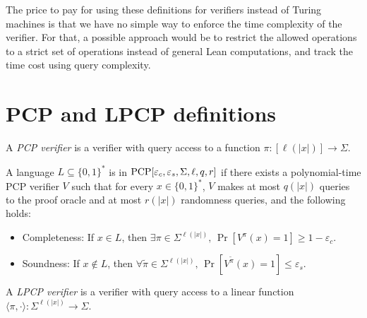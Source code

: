 \begin{remark}
The price to pay for using these definitions for verifiers instead of Turing machines is that we have no simple way to enforce
the time complexity of the verifier. For that, a possible approach would be to restrict the allowed operations to a strict set
of operations instead of general Lean computations, and track the time cost using query complexity.
\end{remark}
\section{PCP and LPCP definitions}

\begin{definition}
\label{PCPVerifier}
\leanok
A \emph{PCP verifier} is a verifier with query access to a function $\pi : [\ell (|x|)] \to \Sigma$.
\end{definition}

\begin{definition}
\label{PCP}
\leanok
A language $L \subseteq \{0,1\}^*$ is in
$\mathrm{PCP}[\varepsilon_c, \varepsilon_s, \Sigma, \ell, q, r]$
if there exists a polynomial-time PCP verifier $V$
such that for every $x \in \{0,1\}^*$,
$V$ makes at most $q(|x|)$ queries to the proof oracle and
at most $r(|x|)$ randomness queries, and the following holds:
\begin{itemize}
  \item Completeness: If $x \in L$, then
  $\exists \pi \in \Sigma^{\ell(|x|)}, \,
  \Pr\left[V^\pi(x)=1 \right] \geq 1 - \varepsilon_c$.
  \item Soundness: If $x \notin L$, then
  $\forall \widetilde{\pi} \in \Sigma^{\ell(|x|)},\,
  \Pr\left[V^{\widetilde{\pi}}(x)=1 \right] \leq \varepsilon_s$.
\end{itemize}
\end{definition}

\begin{definition}
\label{LPCPVerifier}
\leanok
A \emph{LPCP verifier} is a verifier with query access to a linear function
$\langle \pi,\cdot \rangle : \Sigma^{\ell(|x|)} \to \Sigma$.
\end{definition}

